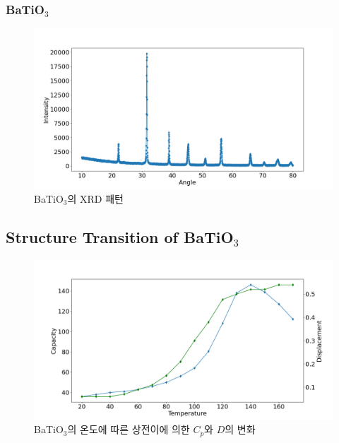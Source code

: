 \documentclass[aps,reprint,superscriptaddress,10pt]{revtex4-2}
\begin{document}

\subsubsection{BaTiO$_3$}

\begin{figure}[htbp]
  \centering
  \includegraphics[scale=0.18]{Ba.png}
  \caption{BaTiO$_3$의 XRD 패턴}
  \label{fig:Ba}

\end{figure}



\subsection{Structure Transition of BaTiO$_3$}
\begin{figure}[htbp]
  \centering
  \includegraphics[scale=0.2]{CD.png}
  \caption{BaTiO$_3$의 온도에 따른 상전이에 의한 $C_p$와 $D$의 변화}
  \label{fig:CD}
\end{figure}
\end{document}
